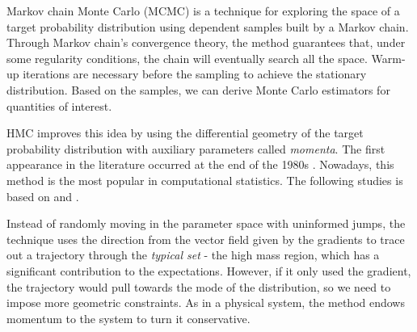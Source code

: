 Markov chain Monte Carlo (MCMC) is a technique for exploring the space of a
target probability distribution using dependent samples built by a Markov
chain. Through Markov chain's convergence theory, the method guarantees that,
under some regularity conditions, the chain will eventually search all the
space. Warm-up iterations are necessary before the sampling to achieve the
stationary distribution. Based on the samples, we can derive Monte Carlo 
estimators for quantities of interest. 

HMC improves this idea by using the differential geometry of the target
probability distribution with auxiliary parameters called {\em momenta}. The
first appearance in the literature occurred at the end of the 1980s
\cite[p. 3]{betancourt2017conceptual}. Nowadays, this method is the most 
popular in computational statistics. The following studies is based on
\textcite{betancourt2017conceptual} and \textcite{betancourt2016diagnosing}.

Instead of randomly moving in the parameter space with uninformed jumps, the
technique uses the direction from the vector field given by the gradients to
trace out a trajectory through the {\em typical set} - the high mass region, which
has a significant contribution to the expectations. However, if it only used
the gradient, the trajectory would pull towards the mode of the distribution,
so we need to impose more geometric constraints. As in a physical system, the
method endows momentum to the system to turn it conservative.

